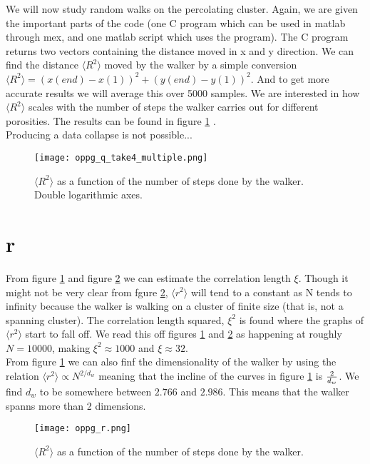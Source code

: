 \documentclass[a4paper,english, 10pt, twoside]{article}
\begin{document}
We will now study random walks on the percolating cluster. Again, we are given the important parts of the code (one C 
program which can be used in matlab through mex, and one matlab script which uses the program). The C program returns 
two vectors containing the distance moved in x and y direction. We can find the distance $\langle R^2\rangle$ moved 
by the walker by a simple conversion $\langle R^2\rangle = (x(end)-x(1))^2 + (y(end)-y(1))^2$. And to get more accurate 
results we will average this over 5000 samples. We are interested in how $\langle R^2\rangle$ scales with the number of 
steps the walker carries out for different porosities. The results can be found in figure \ref{rsquared} .\\
Producing a data collapse is not possible...

\begin{figure}[H]
 \centering
 \texttt{[image: oppg\_q\_take4\_multiple.png]}
 \caption{$\langle R^2\rangle$ as a function of the number of steps done by the walker. Double logarithmic axes.}
 \label{rsquared}
\end{figure}

\section*{r}

From figure \ref{rsquared} and figure \ref{xi} we can estimate the correlation length $\xi$. Though it might not 
be very clear from fgure \ref{xi}, $\langle r^2\rangle$ will tend to a constant as N tends to infinity because the 
walker is walking on a cluster of finite size (that is, not a spanning cluster). The correlation length squared, 
$\xi^2$ is found where the graphs of $\langle r^2\rangle$ start to fall off. We read this off figures \ref{rsquared} 
and \ref{xi} as happening at roughly $N = 10 000$, making $\xi^2 \approx 1000$ and $\xi \approx 32$.\\
From figure \ref{rsquared} we can also finf the dimensionality of the walker by using the relation 
$\langle r^2\rangle \propto N^{2/d_w}$ meaning that the incline of the curves in figure \ref{rsquared} is ${2\over d_w}$. 
We find $d_w$ to be somewhere between $2.766$ and $2.986$. This means that the walker spanns more than 2 dimensions.

\begin{figure}[H]
 \centering
 \texttt{[image: oppg\_r.png]}
 \caption{$\langle R^2\rangle$ as a function of the number of steps done by the walker.}
 \label{xi}
\end{figure}
\end{document}
